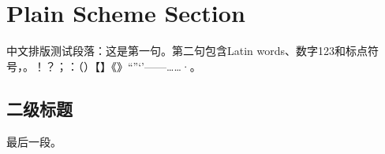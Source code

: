 \documentclass[a4paper,10pt,UTF8,scheme=plain]{ctexart}
\begin{document}
\section{Plain Scheme Section}
中文排版测试段落：这是第一句。第二句包含Latin words、数字123和标点符号，。！？；：（）【】《》“”‘’——……·。
\subsection{二级标题}
最后一段。
\end{document}
